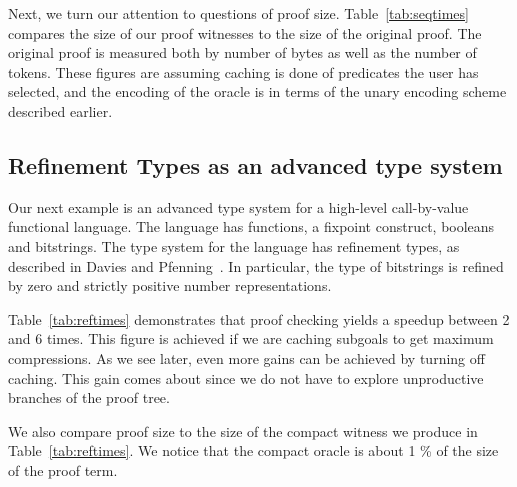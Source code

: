 \documentclass{llncs}
\begin{document}
Next, we turn our attention to questions of proof size. 
Table~\ref{tab:seqtimes} compares the size of our proof witnesses to the
size of the original proof. The original proof is measured both by number 
of bytes as well as the number of tokens. These figures are assuming 
caching is done of predicates the user has selected, and the encoding of
the oracle is in terms of the unary encoding scheme described earlier.

\subsection{Refinement Types as an advanced type system}
Our next example is an advanced type system for a high-level
call-by-value functional language. The language has functions, a
fixpoint construct, booleans and bitstrings. The type system for the
language has refinement types, as described in Davies and
Pfenning~\cite{davies+:intersection}. In particular, the type of
bitstrings is refined by zero and strictly positive number
representations.

Table~\ref{tab:reftimes} demonstrates that proof checking yields a
speedup between 2 and 6 times. This figure is achieved if we are caching
subgoals to get maximum compressions. As we see later, even more gains
can be achieved by turning off caching. 
This gain comes about since we do not have to explore unproductive
branches of the proof tree.

We also compare proof size to the size of the compact witness we
produce in Table~\ref{tab:reftimes}. We notice that the compact oracle
is about 1 \% of the size of the proof term.
\end{document}
